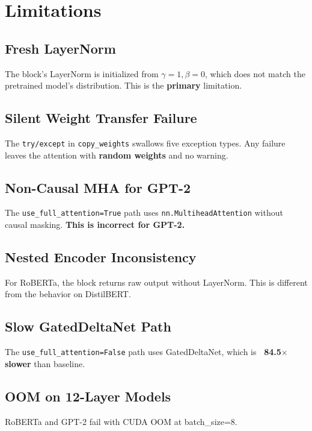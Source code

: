 
\section{Limitations}

\subsection{Fresh LayerNorm}

The block's LayerNorm is initialized from $\gamma = 1, \beta = 0$, which 
does not match the pretrained model's distribution. This is the \textbf{primary} 
limitation.

\subsection{Silent Weight Transfer Failure}

The \texttt{try/except} in \texttt{copy\_weights} swallows five exception types. Any 
failure leaves the attention with \textbf{random weights} and no warning.

\subsection{Non-Causal MHA for GPT-2}

The \texttt{use\_full\_attention=True} path uses \texttt{nn.MultiheadAttention} without 
causal masking. \textbf{This is incorrect for GPT-2.}

\subsection{Nested Encoder Inconsistency}

For RoBERTa, the block returns raw output without LayerNorm. This is 
different from the behavior on DistilBERT.

\subsection{Slow GatedDeltaNet Path}

The \texttt{use\_full\_attention=False} path uses GatedDeltaNet, which is 
\textbf{~84.5$\times$ slower} than baseline.

\subsection{OOM on 12-Layer Models}

RoBERTa and GPT-2 fail with CUDA OOM at batch\_size=8.

